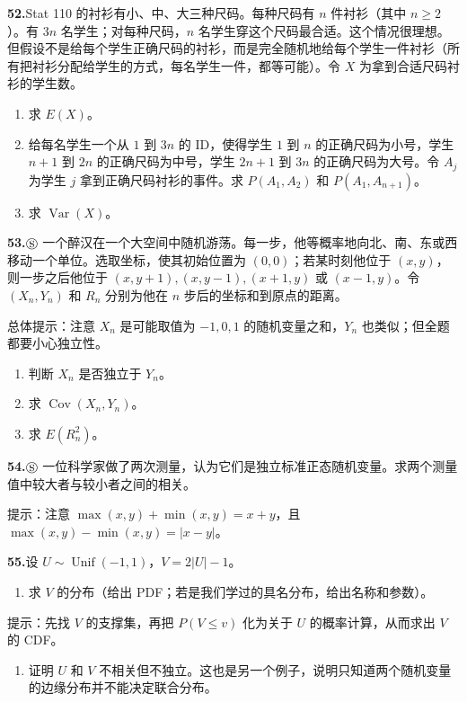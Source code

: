 \documentclass[UTF8,12pt,a4paper,fontset=fandol]{ctexart}
\begin{document}
\noindent\textbf{52.}\quad Stat 110 的衬衫有小、中、大三种尺码。每种尺码有 $n$ 件衬衫（其中 $n\ge 2$）。有 $3n$ 名学生；对每种尺码，$n$ 名学生穿这个尺码最合适。这个情况很理想。但假设不是给每个学生正确尺码的衬衫，而是完全随机地给每个学生一件衬衫（所有把衬衫分配给学生的方式，每名学生一件，都等可能）。令 $X$ 为拿到合适尺码衬衫的学生数。
\begin{enumerate}
  \item[(a)] 求 $E(X)$。
  \item[(b)] 给每名学生一个从 $1$ 到 $3n$ 的 ID，使得学生 $1$ 到 $n$ 的正确尺码为小号，学生 $n+1$ 到 $2n$ 的正确尺码为中号，学生 $2n+1$ 到 $3n$ 的正确尺码为大号。令 $A_j$ 为学生 $j$ 拿到正确尺码衬衫的事件。求 $P(A_1,A_2)$ 和 $P(A_1,A_{n+1})$。
  \item[(c)] 求 $\operatorname{Var}(X)$。
\end{enumerate}

\noindent\textbf{53.}\quad $\circledS$ 一个醉汉在一个大空间中随机游荡。每一步，他等概率地向北、南、东或西移动一个单位。选取坐标，使其初始位置为 $(0,0)$；若某时刻他位于 $(x,y)$，则一步之后他位于 $(x,y+1),(x,y-1),(x+1,y)$ 或 $(x-1,y)$。令 $(X_n,Y_n)$ 和 $R_n$ 分别为他在 $n$ 步后的坐标和到原点的距离。

总体提示：注意 $X_n$ 是可能取值为 $-1,0,1$ 的随机变量之和，$Y_n$ 也类似；但全题都要小心独立性。
\begin{enumerate}
  \item[(a)] 判断 $X_n$ 是否独立于 $Y_n$。
  \item[(b)] 求 $\operatorname{Cov}(X_n,Y_n)$。
  \item[(c)] 求 $E(R_n^2)$。
\end{enumerate}

\noindent\textbf{54.}\quad $\circledS$ 一位科学家做了两次测量，认为它们是独立标准正态随机变量。求两个测量值中较大者与较小者之间的相关。

提示：注意 $\max(x,y)+\min(x,y)=x+y$，且 $\max(x,y)-\min(x,y)=|x-y|$。

\noindent\textbf{55.}\quad 设 $U\sim \operatorname{Unif}(-1,1)$，$V=2|U|-1$。
\begin{enumerate}
  \item[(a)] 求 $V$ 的分布（给出 PDF；若是我们学过的具名分布，给出名称和参数）。
\end{enumerate}
提示：先找 $V$ 的支撑集，再把 $P(V\le v)$ 化为关于 $U$ 的概率计算，从而求出 $V$ 的 CDF。
\begin{enumerate}
  \item[(b)] 证明 $U$ 和 $V$ 不相关但不独立。这也是另一个例子，说明只知道两个随机变量的边缘分布并不能决定联合分布。
\end{enumerate}
\end{document}
